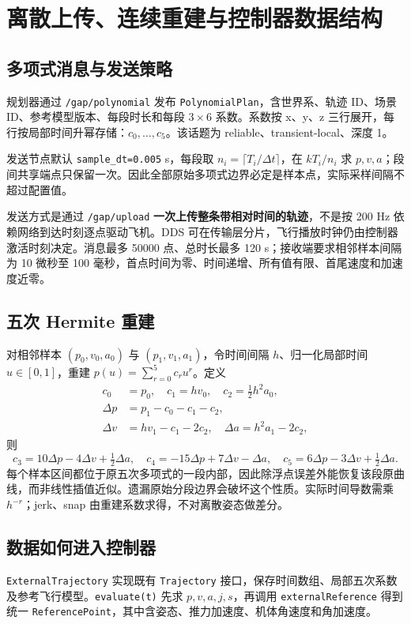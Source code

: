 \documentclass[UTF8,fontset=fandol,a4paper,10pt]{ctexart}
\newcommand{\code}[1]{{\small\nolinkurl{#1}}}
\begin{document}
\section{离散上传、连续重建与控制器数据结构}
\subsection{多项式消息与发送策略}
规划器通过 \code{/gap/polynomial} 发布 \code{PolynomialPlan}，含世界系、轨迹 ID、场景 ID、参考模型版本、每段时长和每段 $3\times6$ 系数。系数按 x、y、z 三行展开，每行按局部时间升幂存储：$c_0,\ldots,c_5$。该话题为 reliable、transient-local、深度 1。

发送节点默认 \code{sample_dt=0.005} s，每段取 $n_i=\lceil T_i/\Delta t\rceil$，在 $kT_i/n_i$ 求 $p,v,a$；段间共享端点只保留一次。因此全部原始多项式边界必定是样本点，实际采样间隔不超过配置值。

发送方式是通过 \code{/gap/upload} \textbf{一次上传整条带相对时间的轨迹}，不是按 200 Hz 依赖网络到达时刻逐点驱动飞机。DDS 可在传输层分片，飞行播放时钟仍由控制器激活时刻决定。消息最多 50000 点、总时长最多 120 s；接收端要求相邻样本间隔为 10 微秒至 100 毫秒，首点时间为零、时间递增、所有值有限、首尾速度和加速度近零。

\subsection{五次 Hermite 重建}
对相邻样本 $(p_0,v_0,a_0)$ 与 $(p_1,v_1,a_1)$，令时间间隔 $h$、归一化局部时间 $u\in[0,1]$，重建 $p(u)=\sum_{r=0}^5c_ru^r$。定义
\begin{align*}
 c_0&=p_0,\quad c_1=hv_0,\quad c_2=\tfrac12h^2a_0,\\
 \Delta p&=p_1-c_0-c_1-c_2,\\
 \Delta v&=hv_1-c_1-2c_2,\quad \Delta a=h^2a_1-2c_2,
\end{align*}
则
\[
 c_3=10\Delta p-4\Delta v+\tfrac12\Delta a,\quad
 c_4=-15\Delta p+7\Delta v-\Delta a,\quad
 c_5=6\Delta p-3\Delta v+\tfrac12\Delta a.
\]
每个样本区间都位于原五次多项式的一段内部，因此除浮点误差外能恢复该段原曲线，而非线性插值近似。遗漏原始分段边界会破坏这个性质。实际时间导数需乘 $h^{-r}$；jerk、snap 由重建系数求得，不对离散姿态做差分。

\subsection{数据如何进入控制器}
\code{ExternalTrajectory} 实现既有 \code{Trajectory} 接口，保存时间数组、局部五次系数及参考飞行模型。\code{evaluate(t)} 先求 $p,v,a,j,s$，再调用 \code{externalReference} 得到统一 \code{ReferencePoint}，其中含姿态、推力加速度、机体角速度和角加速度。
\end{document}
